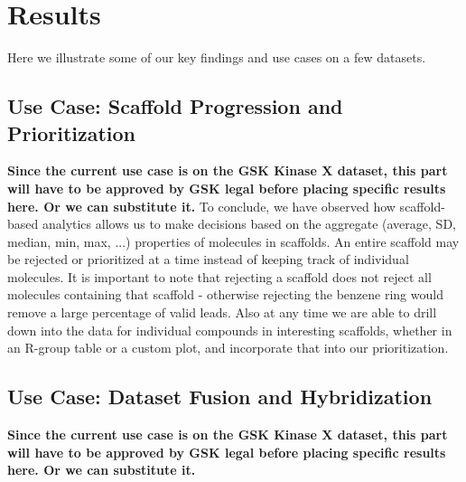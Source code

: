 \documentclass[journal=jacsat,manuscript=article]{achemso}
\begin{document}
\section{Results}
\label{sec:results}
Here we illustrate some of our key findings and use cases on a few datasets. 

\subsection{Use Case: Scaffold Progression and Prioritization}
\textbf{Since the current use case is on the GSK Kinase X dataset, this part will have to be approved by GSK legal before placing specific results here. Or we can substitute it.}
To conclude, we have observed how scaffold-based analytics allows us to make decisions based on the aggregate (average, SD, median, min, max, ...) properties of molecules in scaffolds. An entire scaffold may be rejected or prioritized at a time instead of keeping track of individual molecules. It is important to note that rejecting a scaffold does not reject all molecules containing that scaffold - otherwise rejecting the benzene ring would remove a large percentage of valid leads. Also at any time we are able to drill down into the data for individual compounds in interesting scaffolds, whether in an R-group table or a custom plot, and incorporate that into our prioritization.   

\subsection{Use Case: Dataset Fusion and Hybridization}
\textbf{Since the current use case is on the GSK Kinase X dataset, this part will have to be approved by GSK legal before placing specific results here. Or we can substitute it.}
  
\end{document}
